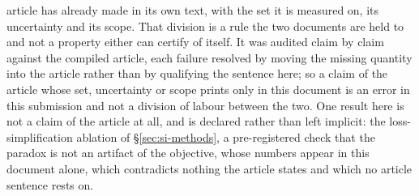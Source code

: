 \documentclass[journal=jcisd8,manuscript=suppinfo,layout=twocolumn]{achemso}
\begin{document}
article has already made in its own text, with the set it is measured on, its uncertainty and its
scope. That division is a rule the two documents are held to and not a property either can certify
of itself. It was audited claim by claim against the compiled article, each failure resolved by
moving the missing quantity into the article rather than by qualifying the sentence here; so a
claim of the article whose set, uncertainty or scope prints only in this
document is an error in this submission and not a division of labour between the two.
One result here is not a claim of the article at all, and is declared rather than left
implicit: the loss-simplification ablation of \S\ref{sec:si-methods}, a pre-registered check
that the paradox is not an artifact of the objective, whose numbers appear in this document alone,
which contradicts nothing the article states and which no article sentence rests on.
\end{document}
